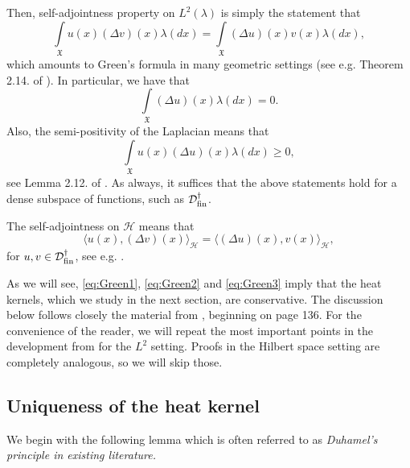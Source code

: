 \documentclass[11pt,reqno]{amsart}
\theoremstyle{remark}
\theoremstyle{definition}
\numberwithin{theorem}{section} \numberwithin{equation}{section}
\newcommand{\Hil}{\mathcal{H}}
\newcommand{\X}{\mathfrak{X}}
\begin{document}
Then, self-adjointness property on $L^2(\lambda)$ is simply the statement that
\begin{equation}\label{eq:Green1}
\int\limits_{\X}u(x)(\Delta v)(x) \lambda(dx) = \int\limits_{\X}(\Delta u)(x)v(x) \lambda(dx),
\end{equation}
which amounts to Green's formula in many geometric settings (see e.g. Theorem 2.14. of \cite{JP19}).  In particular, we have that
\begin{equation}\label{eq:Green2}
\int\limits_{\X}(\Delta u)(x) \lambda(dx) = 0.
\end{equation}
Also, the semi-positivity of the Laplacian means that
\begin{equation}\label{eq:Green3}
\int\limits_{\X}u(x)(\Delta u)(x) \lambda(dx) \geq 0,
\end{equation}
see Lemma 2.12. of  \cite{JP19}. As always, it suffices that the above statements hold for a dense subspace of functions, such as $\mathcal{D}_{\rm fin}^\dagger$.

The self-adjointness on $\Hil$ means that
\begin{equation}\label{eq:Green1}
\langle u(x),(\Delta v)(x) \rangle_\Hil = \langle(\Delta u)(x),v(x) \rangle_\Hil,
\end{equation}
for $u,v \in \mathcal{D}_{\rm fin}^\dagger$, see e.g. \cite{JP19}.


As we will see, \eqref{eq:Green1}, \eqref{eq:Green2} and \eqref{eq:Green3}
imply that the heat kernels, which we study in the next section,
are conservative.
The discussion below follows closely
the material from \cite{Ch84}, beginning on page 136.  For the convenience of the reader,
we will repeat the most important points in the development from \cite{Ch84} for the $L^2$ setting. Proofs in the Hilbert space setting are completely analogous, so we will skip those.

\subsection{Uniqueness of the heat kernel}

We begin with the following lemma which is often referred to as \it Duhamel's principle \rm in existing literature.
\end{document}
